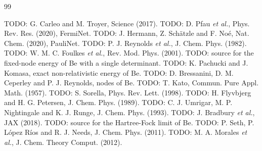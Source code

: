 \documentclass[aps,prb,reprint,amsmath,amssymb,superscriptaddress,nofootinbib]{revtex4-2}
\begin{document}
\begin{thebibliography}{99}

 TODO: G. Carleo and M. Troyer, Science (2017).
 TODO: D. Pfau \emph{et al.}, Phys. Rev. Res. (2020), FermiNet.
 TODO: J. Hermann, Z. Sch\"atzle and F. No\'e, Nat. Chem. (2020), PauliNet.
 TODO: P. J. Reynolds \emph{et al.}, J. Chem. Phys. (1982).
 TODO: W. M. C. Foulkes \emph{et al.}, Rev. Mod. Phys. (2001).
 TODO: source for the fixed-node energy of Be with a single determinant.
 TODO: K. Pachucki and J. Komasa, exact non-relativistic energy of Be.
 TODO: D. Bressanini, D. M. Ceperley and P. J. Reynolds, nodes of Be.
 TODO: T. Kato, Commun. Pure Appl. Math. (1957).
 TODO: S. Sorella, Phys. Rev. Lett. (1998).
 TODO: H. Flyvbjerg and H. G. Petersen, J. Chem. Phys. (1989).
 TODO: C. J. Umrigar, M. P. Nightingale and K. J. Runge, J. Chem. Phys. (1993).
 TODO: J. Bradbury \emph{et al.}, JAX (2018).
 TODO: source for the Hartree-Fock limit of Be.
 TODO: P. Seth, P. L\'opez R\'ios and R. J. Needs, J. Chem. Phys. (2011).
 TODO: M. A. Morales \emph{et al.}, J. Chem. Theory Comput. (2012).

\end{thebibliography}
\end{document}
